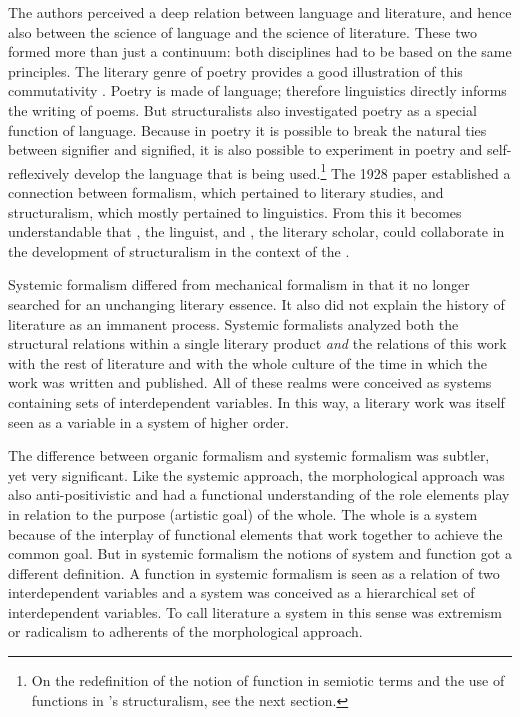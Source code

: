 \documentclass[output=paper]{langscibook}
\begin{document}
The authors perceived a deep relation between language and literature, and hence also between the science of language and the science of literature. These two formed more than just a continuum: both disciplines had to be based on the same principles. The literary genre of poetry provides a good illustration of this commutativity \citep[see][]{Jakobson1981poetry,Jakobson1981landp}. Poetry is made of language; therefore linguistics directly informs the writing of poems. But structuralists also investigated poetry as a special function of language. Because in poetry it is possible to break the natural ties between signifier and signified, it is also possible to experiment in poetry and self-reflexively develop the language that is being used.\footnote{On the redefinition of the notion of function in semiotic terms and the use of functions in {\Jakobson}'s structuralism, see the next section.} The 1928 paper established a connection between formalism, which pertained to literary studies, and structuralism, which mostly pertained to linguistics. From this it becomes understandable that {\Jakobson}, the linguist, and {\Mukarovsky}, the literary scholar, could collaborate in the development of structuralism in the context of the {\PragueLinguisticCircle}. 

Systemic formalism differed from mechanical formalism in that it no longer searched for an unchanging literary essence. It also did not explain the history of literature as an immanent process. Systemic formalists analyzed both the structural relations within a single literary product \emph{and} the relations of this work with the rest of literature and with the whole culture of the time in which the work was written and published. All of these realms were conceived as systems containing sets of interdependent variables. In this way, a literary work was itself seen as a variable in a system of higher order.  

The difference between organic formalism and systemic formalism was subtler, yet very significant. Like the systemic approach, the morphological approach was also anti-positivistic and had a functional understanding of the role elements play in relation to the purpose (artistic goal) of the whole. The whole is a system because of the interplay of functional elements that work together to achieve the common goal. But in systemic formalism the notions of system and function got a different definition. A function in systemic formalism is seen as a relation of two interdependent variables and a system was conceived as a hierarchical set of interdependent variables. To call literature a system in this sense was extremism or radicalism to adherents of the morphological approach.
\end{document}
